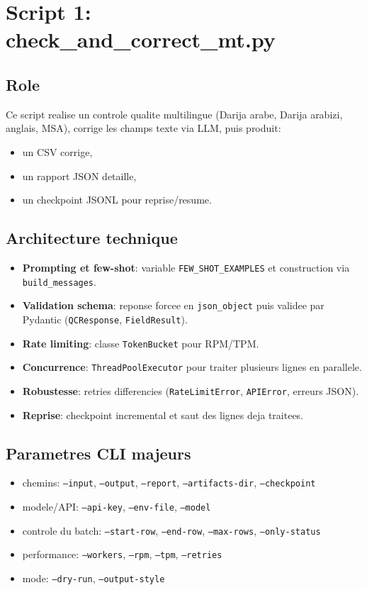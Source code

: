 \documentclass[11pt,a4paper]{article}
\begin{document}
\section{Script 1: check\_and\_correct\_mt.py}
\subsection{Role}
Ce script realise un controle qualite multilingue (Darija arabe, Darija arabizi, anglais, MSA), corrige les champs texte via LLM, puis produit:
\begin{itemize}[leftmargin=*]
  \item un CSV corrige,
  \item un rapport JSON detaille,
  \item un checkpoint JSONL pour reprise/resume.
\end{itemize}

\subsection{Architecture technique}
\begin{itemize}[leftmargin=*]
  \item \textbf{Prompting et few-shot}: variable \texttt{FEW\_SHOT\_EXAMPLES} et construction via \texttt{build\_messages}. 
  \item \textbf{Validation schema}: reponse forcee en \texttt{json\_object} puis validee par Pydantic (\texttt{QCResponse}, \texttt{FieldResult}).
  \item \textbf{Rate limiting}: classe \texttt{TokenBucket} pour RPM/TPM.
  \item \textbf{Concurrence}: \texttt{ThreadPoolExecutor} pour traiter plusieurs lignes en parallele.
  \item \textbf{Robustesse}: retries differencies (\texttt{RateLimitError}, \texttt{APIError}, erreurs JSON).
  \item \textbf{Reprise}: checkpoint incremental et saut des lignes deja traitees.
\end{itemize}

\subsection{Parametres CLI majeurs}
\begin{itemize}[leftmargin=*]
  \item chemins: \texttt{--input}, \texttt{--output}, \texttt{--report}, \texttt{--artifacts-dir}, \texttt{--checkpoint}
  \item modele/API: \texttt{--api-key}, \texttt{--env-file}, \texttt{--model}
  \item controle du batch: \texttt{--start-row}, \texttt{--end-row}, \texttt{--max-rows}, \texttt{--only-status}
  \item performance: \texttt{--workers}, \texttt{--rpm}, \texttt{--tpm}, \texttt{--retries}
  \item mode: \texttt{--dry-run}, \texttt{--output-style}
\end{itemize}
\end{document}
